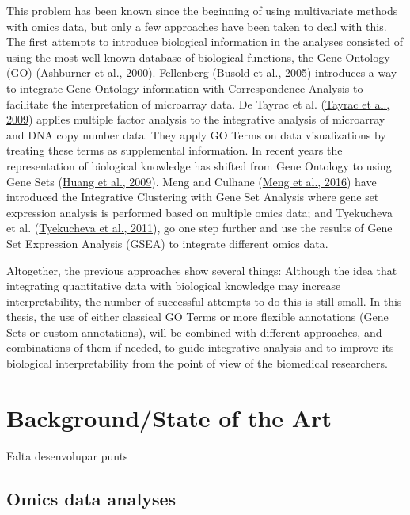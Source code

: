 \documentclass[a4paper, nobind]{templates/ociamthesis}
\begin{document}
This problem has been known since the beginning of using multivariate methods with omics data, but only a few approaches have been taken to deal with this. The first attempts to introduce biological information in the analyses consisted of using the most well-known database of biological functions, the Gene Ontology (GO) (\protect\hyperlink{ref-ashburner_gene_2000}{Ashburner et al., 2000}). Fellenberg (\protect\hyperlink{ref-busold_integration_2005}{Busold et al., 2005}) introduces a way to integrate Gene Ontology information with Correspondence Analysis to facilitate the interpretation of microarray data. De Tayrac et al. (\protect\hyperlink{ref-de_tayrac_simultaneous_2009}{Tayrac et al., 2009}) applies multiple factor analysis to the integrative analysis of microarray and DNA copy number data. They apply GO Terms on data visualizations by treating these terms as supplemental information. In recent years the representation of biological knowledge has shifted from Gene Ontology to using Gene Sets (\protect\hyperlink{ref-huang_bioinformatics_2009}{Huang et al., 2009}). Meng and Culhane (\protect\hyperlink{ref-meng_dimension_2016}{Meng et al., 2016}) have introduced the Integrative Clustering with Gene Set Analysis where gene set expression analysis is performed based on multiple omics data; and Tyekucheva et al. (\protect\hyperlink{ref-tyekucheva_integrating_2011}{Tyekucheva et al., 2011}), go one step further and use the results of Gene Set Expression Analysis (GSEA) to integrate different omics data.

Altogether, the previous approaches show several things: Although the idea that integrating quantitative data with biological knowledge may increase interpretability, the number of successful attempts to do this is still small. In this thesis, the use of either classical GO Terms or more flexible annotations (Gene Sets or custom annotations), will be combined with different approaches, and combinations of them if needed, to guide integrative analysis and to improve its biological interpretability from the point of view of the biomedical researchers.

\hypertarget{backgroundstate-of-the-art}{%
\section{Background/State of the Art}\label{backgroundstate-of-the-art}}

Falta desenvolupar punts

\hypertarget{omics-data-analyses}{%
\subsection{Omics data analyses}\label{omics-data-analyses}}
\end{document}
